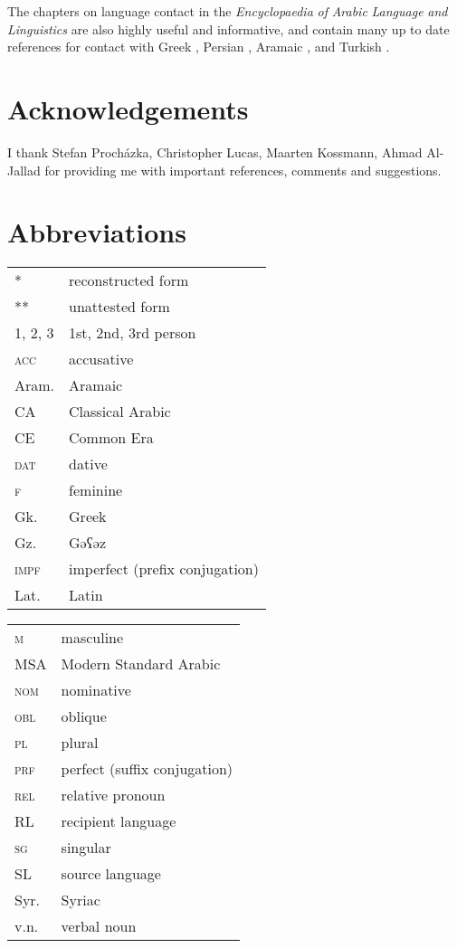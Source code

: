 \documentclass[output=paper]{langsci/langscibook}
\begin{document}
The chapters on language contact in the \textit{Encyclopaedia} \textit{of} \textit{Arabic} \textit{Language} \textit{and} \textit{Linguistics} are also highly useful and informative, and contain many up to date references for contact with Greek \citep{Gutas2011}, Persian \citep{Asbaghi2011}, Aramaic \cite{Retsö2011}, and Turkish \citep{Procházka2011Turkish}.

\section*{Acknowledgements}
I thank Stefan Procházka, Christopher Lucas, Maarten Kossmann, Ahmad Al-Jallad for providing me with important references, comments and suggestions.

\section*{Abbreviations}
\begin{tabularx}{.5\textwidth}{@{}lQ@{}}
*             &  reconstructed form\\
**            &  unattested form\\
\textsc {1, 2, 3} & 1st, 2nd, 3rd person \\
\textsc{acc}  &  accusative\\
Aram.         &  Aramaic\\
CA            &  Classical Arabic\\
CE            &  Common Era\\
\textsc{dat}  &  dative\\
\textsc{f}    &  feminine\\
Gk.           &  Greek\\
Gz.           &  Gəʕəz\\
\textsc{impf} &  imperfect (prefix conjugation)\\
Lat.           &  Latin\\
\end{tabularx}%
\begin{tabularx}{.5\textwidth}{@{}lQ@{}}
\textsc{m}    &  masculine\\
MSA           &  Modern Standard Arabic\\
\textsc{nom}  &  nominative\\
\textsc{obl}  &  oblique\\
\textsc{pl}   &  plural\\
\textsc{prf}  &  perfect (suffix conjugation)\\
\textsc{rel}  &  relative pronoun\\
RL          &  recipient language\\
\textsc{sg}   &  singular\\
SL          &  source language\\
Syr.          &  Syriac\\
v.n.         &  verbal noun\\
\end{tabularx}%


{\sloppy\printbibliography[heading=subbibliography,notkeyword=this]}
\end{document}
